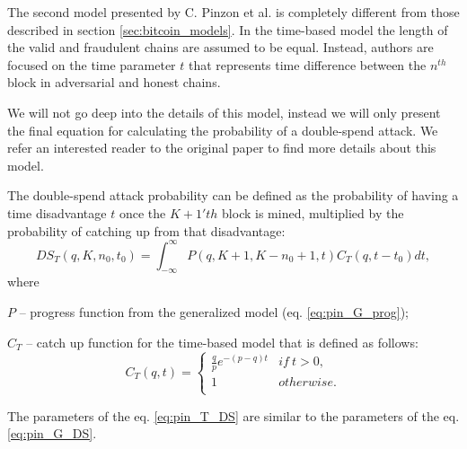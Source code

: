 \documentclass[10pt,a4paper]{article}
\numberwithin{equation}{section} %
\theoremstyle{plain}
\theoremstyle{definition}
\theoremstyle{remark}
\begin{document}
	The second model presented by C. Pinzon et al. is completely different from those described in section \ref{sec:bitcoin_models}. In the time-based model the length of the valid and fraudulent chains are assumed to be equal. Instead, authors are focused on the time parameter \(t\) that represents time difference between the \(n^{th}\) block in adversarial and honest chains.
	
	We will not go deep into the details of this model, instead we will only present the final equation for calculating the probability of a double-spend attack. We refer an interested reader to the original paper \cite{PR16} to find more details about this model.
	
	The double-spend attack probability can be defined as the probability of having a time disadvantage \(t\) once the \(K+1'th\) block is mined, multiplied by the probability of catching up from that disadvantage:
	\begin{equation}  \label{eq:pin_T_DS}
	    DS_T(q,K,n_0,t_0) = \int_{-\infty}^{\infty} P(q,K+1,K-n_0+1,t)C_T(q,t-t_0)dt,
	\end{equation}
	where
	
	\(P\) -- progress function from the generalized model (eq. \ref{eq:pin_G_prog});
	
	\(C_T\) -- catch up function for the time-based model that is defined as follows:
	\[C_T(q,t) =
	    \left\{
            \begin{array}{ll}
                \frac{q}{p}e^{-(p-q)t} & if\ t > 0, \\
                1 & otherwise. \\
            \end{array}
        \right.
	\]
	
	The parameters of the eq. \ref{eq:pin_T_DS} are similar to the parameters of the eq. \ref{eq:pin_G_DS}.
	
\end{document}
